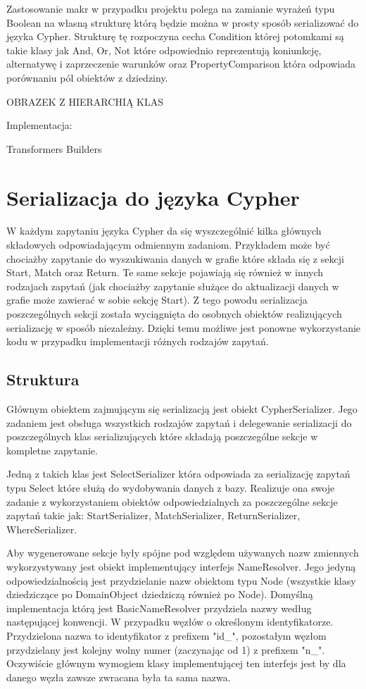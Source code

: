 \documentclass[brudnopis]{xmgr}
\begin{document}
Zastosowanie makr w przypadku projektu polega na zamianie wyrażeń typu Boolean na własną strukturę którą będzie można w prosty sposób serializować do języka Cypher. Strukturę tę rozpoczyna cecha Condition której potomkami są takie klasy jak And, Or, Not które odpowiednio reprezentują koniunkcję, alternatywę i zaprzeczenie warunków oraz PropertyComparison która odpowiada porównaniu pól obiektów z dziedziny.

OBRAZEK Z HIERARCHIĄ KLAS

Implementacja:

Transformers
Builders

\section{Serializacja do języka Cypher}

W każdym zapytaniu języka Cypher da się wyszczególnić kilka głównych składowych odpowiadającym odmiennym zadaniom. Przykładem może być chociażby zapytanie do wyszukiwania danych w grafie które składa się z sekcji Start, Match oraz Return. Te same sekcje pojawiają się również w innych rodzajach zapytań (jak chociażby zapytanie służące do aktualizacji danych w grafie może zawierać w sobie sekcję Start). Z tego powodu serializacja poszczególnych sekcji została wyciągnięta do osobnych obiektów realizujących serializację w sposób niezależny. Dzięki temu możliwe jest ponowne wykorzystanie kodu w przypadku implementacji różnych rodzajów zapytań.

\subsection{Struktura}

Głównym obiektem zajmującym się serializacją jest obiekt CypherSerializer. Jego zadaniem jest obsługa wszystkich rodzajów zapytań i delegewanie serializacji do poszczególnych klas serializujących które składają poszczególne sekcje w kompletne zapytanie.

Jedną z takich klas jest SelectSerializer która odpowiada za serializację zapytań typu Select które służą do wydobywania danych z bazy. Realizuje ona swoje zadanie z wykorzystaniem obiektów odpowiedzialnych za poszczególne sekcje zapytań takie jak: StartSerializer, MatchSerializer, ReturnSerializer, WhereSerializer.

Aby wygenerowane sekcje były spójne pod względem używanych nazw zmiennych wykorzystywany jest obiekt implementujący interfejs NameResolver. Jego jedyną odpowiedzialnością jest przydzielanie nazw obiektom typu Node (wszystkie klasy dziedziczące po DomainObject dziedziczą również po Node). Domyślną implementacja którą jest BasicNameResolver przydziela nazwy według następującej konwencji. W przypadku węzłów o określonym identyfikatorze. Przydzielona nazwa to identyfikator z prefixem "id\_", pozostałym węzłom przydzielany jest kolejny wolny numer (zaczynając od 1) z prefixem "n\_". Oczywiście głównym wymogiem klasy implementującej ten interfejs jest by dla danego węzła zawsze zwracana była ta sama nazwa.
\end{document}
